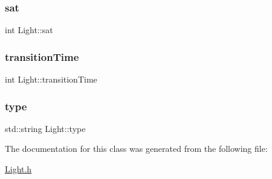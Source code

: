 \mbox{\label{class_light_afbfb00988ab1c1e0a07fa20941c6f2bf}} 
\subsubsection{\texorpdfstring{sat}{sat}}
{\footnotesize\ttfamily int Light\+::sat\hspace{0.3cm}{\ttfamily [private]}}

\mbox{\label{class_light_abd73358fde9001da39f147d878f9dab8}} 
\subsubsection{\texorpdfstring{transition\+Time}{transitionTime}}
{\footnotesize\ttfamily int Light\+::transition\+Time\hspace{0.3cm}{\ttfamily [private]}}

\mbox{\label{class_light_a2825ae88a1158e927a6d16bea9175e56}} 
\subsubsection{\texorpdfstring{type}{type}}
{\footnotesize\ttfamily std\+::string Light\+::type\hspace{0.3cm}{\ttfamily [private]}}



The documentation for this class was generated from the following file\+:\begin{DoxyCompactItemize}
\item 
\hyperlink{_light_8h}{Light.\+h}\end{DoxyCompactItemize}
